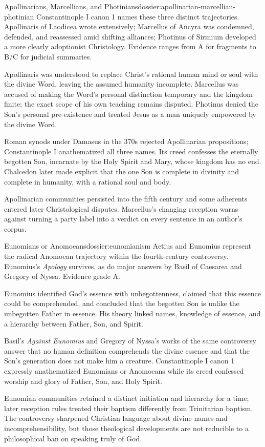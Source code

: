 \begin{heresydossier}{Apollinarians, Marcellians, and Photinians}{dossier:apollinarian-marcellian-photinian}
\objectfield Constantinople I canon 1 names these three distinct trajectories. Apollinaris of Laodicea wrote extensively; Marcellus of Ancyra was condemned, defended, and reassessed amid shifting alliances; Photinus of Sirmium developed a more clearly adoptionist Christology. Evidence ranges from A for fragments to B/C for judicial summaries.

\propositionfield Apollinaris was understood to replace Christ's rational human mind or soul with the divine Word, leaving the assumed humanity incomplete. Marcellus was accused of making the Word's personal distinction temporary and the kingdom finite; the exact scope of his own teaching remains disputed. Photinus denied the Son's personal pre-existence and treated Jesus as a man uniquely empowered by the divine Word.

\responsefield Roman synods under Damasus in the 370s rejected Apollinarian propositions; Constantinople I anathematized all three names. Its creed confesses the eternally begotten Son, incarnate by the Holy Spirit and Mary, whose kingdom has no end. Chalcedon later made explicit that the one Son is complete in divinity and complete in humanity, with a rational soul and body.

\aftermathfield Apollinarian communities persisted into the fifth century and some adherents entered later Christological disputes. Marcellus's changing reception warns against turning a party label into a verdict on every sentence in an author's corpus.
\end{heresydossier}

\begin{heresydossier}{Eunomians or Anomoeans}{dossier:eunomianism}
\objectfield Aetius and Eunomius represent the radical Anomoean trajectory within the fourth-century controversy. Eunomius's \emph{Apology} survives, as do major answers by Basil of Caesarea and Gregory of Nyssa. Evidence grade A.

\propositionfield Eunomius identified God's essence with unbegottenness, claimed that this essence could be comprehended, and concluded that the begotten Son is unlike the unbegotten Father in essence. His theory linked names, knowledge of essence, and a hierarchy between Father, Son, and Spirit.

\responsefield Basil's \emph{Against Eunomius} and Gregory of Nyssa's works of the same controversy answer that no human definition comprehends the divine essence and that the Son's generation does not make him a creature. Constantinople I canon 1 expressly anathematized Eunomians or Anomoeans while its creed confessed worship and glory of Father, Son, and Holy Spirit.

\aftermathfield Eunomian communities retained a distinct initiation and hierarchy for a time; later reception rules treated their baptism differently from Trinitarian baptism. The controversy sharpened Christian language about divine names and incomprehensibility, but those theological developments are not reducible to a philosophical ban on speaking truly of God.
\end{heresydossier}


